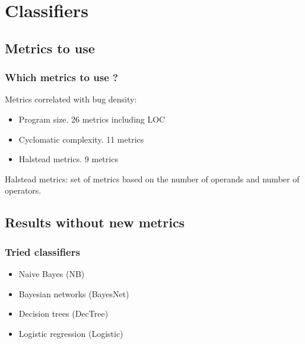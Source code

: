\section{Classifiers}

\subsection{Metrics to use}
\begin{frame}
 \frametitle{Which metrics to use ?}
 Metrics correlated with bug density:
 \begin{itemize}
  \item Program size. 26 metrics including LOC
  \item Cyclomatic complexity. 11 metrics
  \item Halstead metrics. 9 metrics
 \end{itemize}
 \vspace{0.5cm}
 \small Halstead metrics: set of metrics based on the number of operands and number of operators. \normalsize
\end{frame}

\subsection{Results without new metrics}
\begin{frame}
 \frametitle{Tried classifiers}
 \begin{itemize}
  \item Naive Bayes (NB)
  \item Bayesian networks (BayesNet)
  \item Decision trees (DecTree)
  \item Logistic regression (Logistic)
 \end{itemize}
\end{frame}

